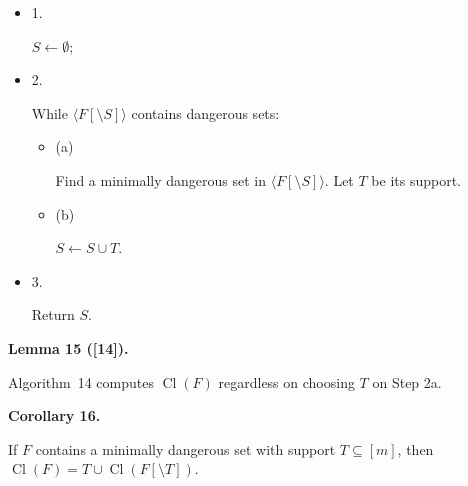 \documentclass[10pt,a4paper]{article}
\begin{document}
\begin{itemize}


\item 
1. 


$S\leftarrow\emptyset$;\par





\item 
2. 


While $\langle F[\setminus S]\rangle$ contains dangerous sets:\par


\begin{itemize}


\item 
(a) 


Find a minimally dangerous set in $\langle F[\setminus S]\rangle$. Let $T$ be its support.\par





\item 
(b) 


$S\leftarrow S\cup T$.\par





\end{itemize}





\item 
3. 


Return $S$.\par





\end{itemize}




\par\medskip\noindent\textbf{
Lemma 15 ([14]).
}\par



Algorithm 14 computes $\mathop{\mathrm{Cl}}(F)$ regardless on choosing $T$ on Step 2a.\par




\par\medskip\noindent\textbf{
Corollary 16.
}\par



If $F$ contains a minimally dangerous set with support $T\subseteq[m]$, then $\mathop{\mathrm{Cl}}(F)=T\cup\mathop{\mathrm{Cl}}(F[\setminus T])$.\par
\end{document}

